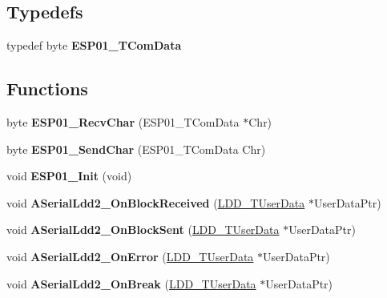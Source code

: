 \subsection*{Typedefs}
\begin{DoxyCompactItemize}
\item 
\mbox{\label{group___e_s_p01__module_ga488202383ee5c973a092bcb544914037}} 
typedef byte {\bfseries E\+S\+P01\+\_\+\+T\+Com\+Data}
\end{DoxyCompactItemize}
\subsection*{Functions}
\begin{DoxyCompactItemize}
\item 
\mbox{\label{group___e_s_p01__module_gad4247ba5710101093aacc457074c74c5}} 
byte {\bfseries E\+S\+P01\+\_\+\+Recv\+Char} (E\+S\+P01\+\_\+\+T\+Com\+Data $\ast$Chr)
\item 
\mbox{\label{group___e_s_p01__module_ga7db3e39398dcc4280e3a4bbf63ea88c7}} 
byte {\bfseries E\+S\+P01\+\_\+\+Send\+Char} (E\+S\+P01\+\_\+\+T\+Com\+Data Chr)
\item 
\mbox{\label{group___e_s_p01__module_ga9d269057d0c685b8d214ce441b9e4ebe}} 
void {\bfseries E\+S\+P01\+\_\+\+Init} (void)
\item 
\mbox{\label{group___e_s_p01__module_ga7a02cc6280b30d13707952d78f8e6c73}} 
void {\bfseries A\+Serial\+Ldd2\+\_\+\+On\+Block\+Received} (\hyperlink{group___p_e___types__module_ga0b66a73f87238a782318aa0be7578e35}{L\+D\+D\+\_\+\+T\+User\+Data} $\ast$User\+Data\+Ptr)
\item 
\mbox{\label{group___e_s_p01__module_ga723758484ee852a66a707036a9a38a92}} 
void {\bfseries A\+Serial\+Ldd2\+\_\+\+On\+Block\+Sent} (\hyperlink{group___p_e___types__module_ga0b66a73f87238a782318aa0be7578e35}{L\+D\+D\+\_\+\+T\+User\+Data} $\ast$User\+Data\+Ptr)
\item 
\mbox{\label{group___e_s_p01__module_ga145a063bdf852caee1c1b8adeb02fc77}} 
void {\bfseries A\+Serial\+Ldd2\+\_\+\+On\+Error} (\hyperlink{group___p_e___types__module_ga0b66a73f87238a782318aa0be7578e35}{L\+D\+D\+\_\+\+T\+User\+Data} $\ast$User\+Data\+Ptr)
\item 
\mbox{\label{group___e_s_p01__module_ga702765a2c9f1c0e914a6ca8484088ec5}} 
void {\bfseries A\+Serial\+Ldd2\+\_\+\+On\+Break} (\hyperlink{group___p_e___types__module_ga0b66a73f87238a782318aa0be7578e35}{L\+D\+D\+\_\+\+T\+User\+Data} $\ast$User\+Data\+Ptr)
\end{DoxyCompactItemize}
